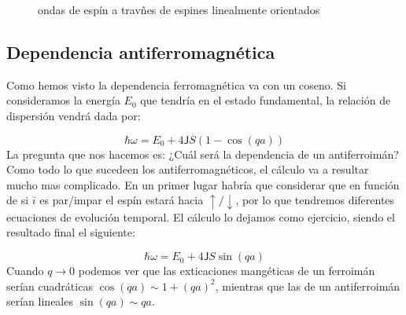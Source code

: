 \documentclass[12pt,a4paper]{book}
\numberwithin{equation}{section}
\numberwithin{figure}{section}
\newcommand{\Jsf}{\mathsf{J}}
\begin{document}
\begin{figure}[h!]
\centering
{}
\caption{ondas de espín a travñes de espines linealmente orientados}
\label{Fig:06-06-01}
\end{figure}

\subsection{Dependencia antiferromagnética}

Como hemos visto la dependencia ferromagnética va con un coseno. Si consideramos la energía $E_0$ que tendría en el estado fundamental, la relación de dispersión vendrá dada por:

\begin{equation}
    \hbar \omega = E_0 + 4 \Jsf S (1-\cos (qa))
\end{equation}
La pregunta que nos hacemos es: ¿Cuál será la dependencia de un antiferroimán? Como todo lo que sucedeen los antiferromagnéticos, el cálculo va a resultar mucho mas complicado. En un primer lugar habría que considerar que en función de si $i$ es par/impar el espín estará hacia $\uparrow/\downarrow$, por lo que tendremos diferentes ecuaciones de evolución temporal. El cálculo lo dejamos como ejercicio, siendo el resultado final el siguiente:

\begin{equation}
    \hbar \omega = E_0 + 4 \Jsf S \sin (qa)
\end{equation}
Cuando $q \rightarrow 0$ podemos ver que las exticaciones mangéticas de un ferroimán serían cuadráticas $\cos(qa)\sim 1 +(qa)^2$, mientras que las de un antiferroimán serían lineales $\sin(qa) \sim qa$. 
\end{document}
